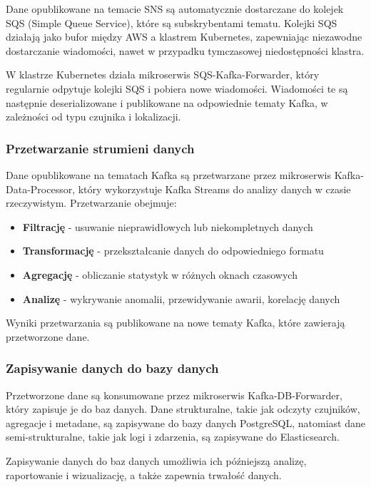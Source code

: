 Dane opublikowane na temacie SNS są automatycznie dostarczane do kolejek SQS (Simple Queue Service), które są subskrybentami tematu. Kolejki SQS działają jako bufor między AWS a klastrem Kubernetes, zapewniając niezawodne dostarczanie wiadomości, nawet w przypadku tymczasowej niedostępności klastra.

W klastrze Kubernetes działa mikroserwis SQS-Kafka-Forwarder, który regularnie odpytuje kolejki SQS i pobiera nowe wiadomości. Wiadomości te są następnie deserializowane i publikowane na odpowiednie tematy Kafka, w zależności od typu czujnika i lokalizacji.

\subsubsection{Przetwarzanie strumieni danych}
\label{subsubsec:przetwarzanie_strumieni}

Dane opublikowane na tematach Kafka są przetwarzane przez mikroserwis Kafka-Data-Processor, który wykorzystuje Kafka Streams do analizy danych w czasie rzeczywistym. Przetwarzanie obejmuje:

\begin{itemize}
    \item \textbf{Filtrację} - usuwanie nieprawidłowych lub niekompletnych danych
    \item \textbf{Transformację} - przekształcanie danych do odpowiedniego formatu
    \item \textbf{Agregację} - obliczanie statystyk w różnych oknach czasowych
    \item \textbf{Analizę} - wykrywanie anomalii, przewidywanie awarii, korelację danych
\end{itemize}

Wyniki przetwarzania są publikowane na nowe tematy Kafka, które zawierają przetworzone dane.

\subsubsection{Zapisywanie danych do bazy danych}
\label{subsubsec:zapisywanie_danych}

Przetworzone dane są konsumowane przez mikroserwis Kafka-DB-Forwarder, który zapisuje je do baz danych. Dane strukturalne, takie jak odczyty czujników, agregacje i metadane, są zapisywane do bazy danych PostgreSQL, natomiast dane semi-strukturalne, takie jak logi i zdarzenia, są zapisywane do Elasticsearch.

Zapisywanie danych do baz danych umożliwia ich późniejszą analizę, raportowanie i wizualizację, a także zapewnia trwałość danych.

